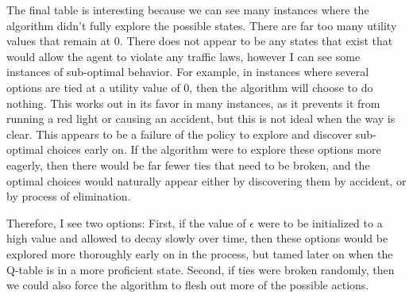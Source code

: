 \documentclass[12pt]{article}
\begin{document}
The final table is interesting because we can see many instances where the algorithm didn't fully explore the possible states.
There are far too many utility values that remain at 0.
There does not appear to be any states that exist that would allow the agent to violate any traffic laws, however I can see some instances of sub-optimal behavior.
For example, in instances where several options are tied at a utility value of 0, then the algorithm will choose to do nothing. 
This works out in its favor in many instances, as it prevents it from running a red light or causing an accident, but this is not ideal when the way is clear.
This appears to be a failure of the policy to explore and discover sub-optimal choices early on.
If the algorithm were to explore these options more eagerly, then there would be far fewer ties that need to be broken, and the optimal choices would naturally appear either by discovering them by accident, or by process of elimination.

Therefore, I see two options:
First, if the value of $\epsilon$ were to be initialized to a high value and allowed to decay slowly over time, then these options would be explored more thoroughly early on in the process, but tamed later on when the Q-table is in a more proficient state.
Second, if ties were broken randomly, then we could also force the algorithm to flesh out more of the possible actions.
\end{document}
